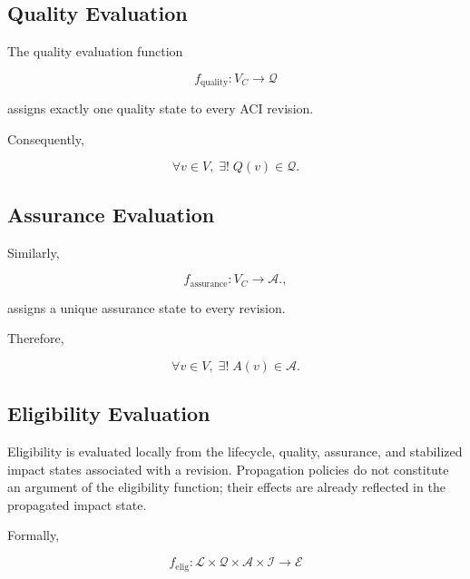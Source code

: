 \documentclass[10pt]{article}
\begin{document}
\subsection{Quality Evaluation}

The quality evaluation function

\begin{equation}
	f_{\mathrm{quality}} : V_C \rightarrow \mathcal Q
	\label{eq:quality_function}
\end{equation}

assigns exactly one quality state to every ACI revision.

Consequently,

\begin{equation}
	\forall v\in V,\;
	\exists!\;
	Q(v)\in\mathcal{Q}.
	\label{eq:quality_total}
\end{equation}

\subsection{Assurance Evaluation}

Similarly,

\begin{equation}
	f_{\mathrm{assurance}} : V_C \rightarrow \mathcal A.,
	\label{eq:assurance_function}
\end{equation}

assigns a unique assurance state to every revision.

Therefore,

\begin{equation}
	\forall v\in V,\;
	\exists!\;
	A(v)\in\mathcal{A}.
	\label{eq:assurance_total}
\end{equation}

\subsection{Eligibility Evaluation}

Eligibility is evaluated locally from the lifecycle, quality, assurance, and stabilized impact states associated with a revision. Propagation policies do not constitute an argument of the eligibility function; their effects are already reflected in the propagated impact state.

Formally,

\begin{equation}
	\label{eq:eligibility_function}
	f_{\mathrm{elig}}
	:
	\mathcal{L}
	\times
	\mathcal{Q}
	\times
	\mathcal{A}
	\times
	\mathcal{I}
	\rightarrow
	\mathcal{E}
\end{equation}
\end{document}
